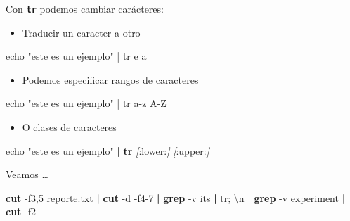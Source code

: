 \documentclass[
]{book}
\newenvironment{Shaded}{\begin{snugshade}}{\end{snugshade}}
\newcommand{\AttributeTok}[1]{\textcolor[rgb]{0.13,0.29,0.53}{#1}}
\newcommand{\BuiltInTok}[1]{#1}
\newcommand{\ExtensionTok}[1]{#1}
\newcommand{\FunctionTok}[1]{\textcolor[rgb]{0.13,0.29,0.53}{\textbf{#1}}}
\newcommand{\KeywordTok}[1]{\textcolor[rgb]{0.13,0.29,0.53}{\textbf{#1}}}
\newcommand{\NormalTok}[1]{#1}
\newcommand{\PreprocessorTok}[1]{\textcolor[rgb]{0.56,0.35,0.01}{\textit{#1}}}
\newcommand{\SpecialStringTok}[1]{\textcolor[rgb]{0.31,0.60,0.02}{#1}}
\newcommand{\StringTok}[1]{\textcolor[rgb]{0.31,0.60,0.02}{#1}}
\providecommand{\tightlist}{%
  \setlength{\itemsep}{0pt}\setlength{\parskip}{0pt}}
\begin{document}
Con \textbf{\texttt{tr}} podemos cambiar carácteres:

\begin{itemize}
\tightlist
\item
  Traducir un caracter a otro
\end{itemize}

\begin{Shaded}
\begin{Highlighting}[]
\NormalTok{echo "este es un ejemplo" | tr \textquotesingle{}e\textquotesingle{} \textquotesingle{}a\textquotesingle{}}
\end{Highlighting}
\end{Shaded}

\begin{itemize}
\tightlist
\item
  Podemos especificar rangos de caracteres
\end{itemize}

\begin{Shaded}
\begin{Highlighting}[]
\NormalTok{echo "este es un ejemplo" | tr a{-}z A{-}Z }
\end{Highlighting}
\end{Shaded}

\begin{itemize}
\tightlist
\item
  O clases de caracteres
\end{itemize}

\begin{Shaded}
\begin{Highlighting}[]
\BuiltInTok{echo} \StringTok{"este es un ejemplo"} \KeywordTok{|} \FunctionTok{tr} \PreprocessorTok{[}\SpecialStringTok{:lower:}\PreprocessorTok{]} \PreprocessorTok{[}\SpecialStringTok{:upper:}\PreprocessorTok{]} 
\end{Highlighting}
\end{Shaded}

Veamos \ldots{}

\begin{Shaded}
\begin{Highlighting}[]
\FunctionTok{cut} \AttributeTok{{-}f3,5}\NormalTok{ reporte.txt }\KeywordTok{|} \FunctionTok{cut} \AttributeTok{{-}d}\StringTok{\textquotesingle{} \textquotesingle{}} \AttributeTok{{-}f4{-}7} \KeywordTok{|} \FunctionTok{grep} \AttributeTok{{-}v} \StringTok{\textquotesingle{}its\textquotesingle{}} \KeywordTok{|} \ExtensionTok{tr}\StringTok{\textquotesingle{};\textquotesingle{}} \StringTok{\textquotesingle{}\textbackslash{}n\textquotesingle{}} \KeywordTok{|} \FunctionTok{grep} \AttributeTok{{-}v} \StringTok{\textquotesingle{}experiment\textquotesingle{}} \KeywordTok{|} \FunctionTok{cut} \AttributeTok{{-}f2}
\end{Highlighting}
\end{Shaded}
\end{document}
